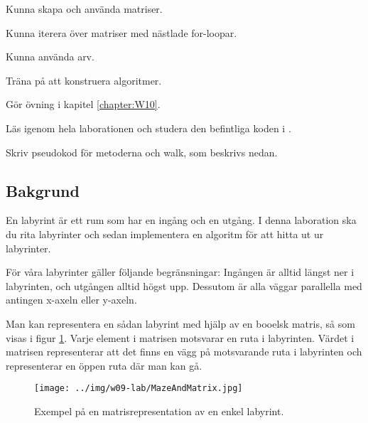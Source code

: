 
\Lab{\LabWeekTEN}

\begin{Goals}
\item Kunna skapa och använda matriser.
\item Kunna iterera över matriser med nästlade for-loopar.
\item Kunna använda arv.
\item Träna på att konstruera algoritmer.
\end{Goals}

\begin{Preparations}
\item Gör övning {\tt \ExeWeekTEN} i kapitel \ref{chapter:W10}.

\item Läs igenom hela laborationen och studera den befintliga koden i .

\item Skriv pseudokod för metoderna  och {walk}, som beskrivs nedan.
\end{Preparations}

\subsection{Bakgrund}

En labyrint är ett rum som har en ingång och en utgång.  I denna laboration ska du rita labyrinter och sedan implementera en algoritm för att hitta ut ur labyrinter.  

För våra labyrinter gäller följande begränsningar: Ingången är alltid längst ner i labyrinten, och utgången alltid högst upp. Dessutom är alla väggar parallella med antingen x-axeln eller y-axeln. 

Man kan representera en sådan labyrint med hjälp av en booelsk matris, så som visas i figur \ref{maze:figboolmatrix}. Varje element i matrisen motsvarar en ruta i labyrinten. Värdet  i matrisen representerar att det finns en vägg på motsvarande ruta i labyrinten och  representerar en öppen ruta där man kan gå.

\begin{figure}[h]
	\begin{center}
		\texttt{[image: ../img/w09-lab/MazeAndMatrix.jpg]}
	\end{center}
	\caption{Exempel på en matrisrepresentation av en enkel labyrint.}
	\label{maze:figboolmatrix}
\end{figure}


